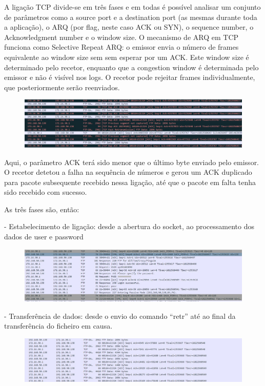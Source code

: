 \documentclass[a4paper]{article}
\begin{document}
A ligação TCP divide-se em três fases e em todas é possível analisar um conjunto de parâmetros como a source port e a destination port (as mesmas durante toda a aplicação), o ARQ (por flag, neste caso ACK ou SYN), o sequence number, o Acknowledgment number e o window size. O mecanismo de ARQ em TCP funciona como Selective Repeat ARQ: o emissor envia o número de frames equivalente ao window size sem sem esperar por um ACK. Este window size é determinado pelo recetor, enquanto que a congestion window é determinada pelo emissor e não é visível nos logs. O recetor pode rejeitar frames individualmente, que posteriormente serão reenviados. 

\begin{figure}[!ht]
\centering
\includegraphics[scale=0.35]{retrans_tcp.jpg} 
\end{figure}

Aqui, o parâmetro ACK terá sido menor que o último byte enviado pelo emissor. O recetor detetou a falha na sequência de números e gerou um ACK duplicado para pacote subsequente recebido nessa ligação, até que o pacote em falta tenha sido recebido com sucesso.

As três fases são, então:

- Estabelecimento de ligação: desde a abertura do socket, ao processamento dos dados de user e password 

\begin{figure}[!ht]
\centering
\includegraphics[scale=0.35]{connection_tcp.jpg}
\end{figure}

- Transferência de dados: desde o envio do comando “retr” até ao final da transferência do ficheiro em causa. 

\begin{figure}[!ht]
\centering
\includegraphics[scale=0.35]{trans_tcp.jpg}
\end{figure}
\end{document}
